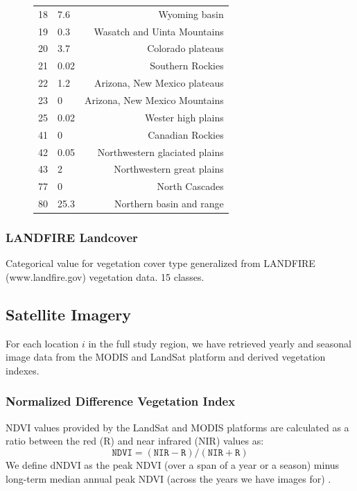 \def\year{2017}\relax \documentclass[letterpaper]{article}
\begin{document}
\begin{figure}
\begin{minipage}[b]{0.49\textwidth}
\begin{tabularx}{\linewidth}{l l r}
		18&7.6&Wyoming basin\\
		19&0.3&Wasatch and Uinta Mountains\\
		20&3.7&Colorado plateaus\\
		21&0.02&Southern Rockies\\
		22&1.2&Arizona, New Mexico plateaus\\
		23&0&Arizona, New Mexico Mountains\\
		25&0.02&Wester high plains\\
		41&0&Canadian Rockies\\
		42&0.05&Northwestern glaciated plains\\
		43&2&Northwestern great plains\\
		77&0&North Cascades\\
		80&25.3&Northern basin and range\\ 
		\bottomrule[.2em]
	\end{tabularx}
      \label{tab:ecomap}
    \end{minipage}

  \end{figure}

\subsubsection{LANDFIRE Landcover}
Categorical value for vegetation cover type generalized from LANDFIRE (www.landfire.gov) vegetation data. 15 classes.\\
\subsection{Satellite Imagery} For each location $i$ in the full study region, we have retrieved yearly and seasonal image data from the MODIS and LandSat platform and derived vegetation indexes.
\subsubsection{Normalized Difference Vegetation Index}
NDVI values provided by the LandSat \cite{usgs2014landsat} and MODIS platforms are calculated as a ratio between the red (R) and near infrared (NIR) values as:
\begin{equation}
\texttt{NDVI} = (\texttt{NIR} - \texttt{R}) / (\texttt{NIR} + \texttt{R})
\end{equation}
We define dNDVI as the peak NDVI (over a span of a year or a season) minus long-term median annual peak NDVI (across the years we have images for) .
\end{document}
